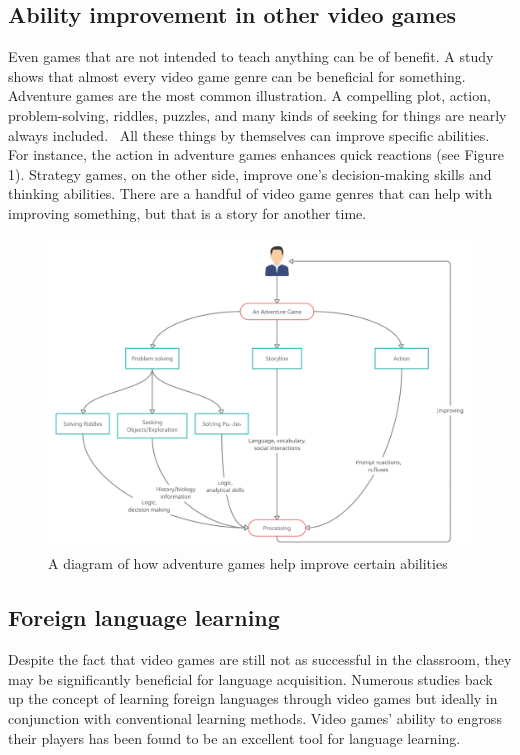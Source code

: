\documentclass[10pt,twoside,english,a4paper]{article}
\begin{document}
\subsection{Ability improvement in other video games}
Even games that are not intended to teach anything can be of benefit. A study shows that almost every video game genre can be beneficial for something. Adventure games are the most common illustration. A compelling plot, action, problem-solving, riddles, puzzles, and many kinds of seeking for things are nearly always included.~\cite{learning} All these things by themselves can improve specific abilities. For instance, the action in adventure games enhances quick reactions (see Figure 1). Strategy games, on the other side, improve one's decision-making skills and thinking abilities. There are a handful of video game genres that can help with improving something, but that is a story for another time. 

\begin{figure}[h]
\centering
\includegraphics[scale=0.16]{adventure}
\caption{A diagram of how adventure games help improve certain abilities}
\end{figure}

\subsection{Foreign language learning}
Despite the fact that video games are still not as successful in the classroom, they may be significantly beneficial for language acquisition. Numerous studies back up the concept of learning foreign languages through video games but ideally in conjunction with conventional learning methods. Video games' ability to engross their players has been found to be an excellent tool for language learning.
\end{document}
